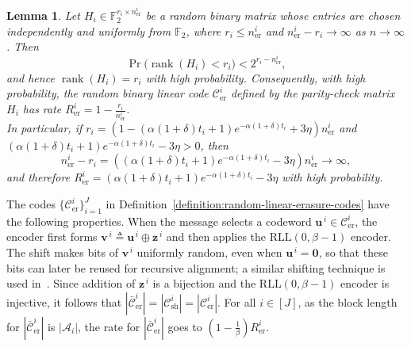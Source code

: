 \documentclass[journal,letterpaper,onecolumn,11pt]{IEEEtran}
\newcommand{\cA}{\mathcal{A}}
\newcommand{\cC}{\mathcal{C}}
\newcommand{\boldu}{\mathbf{u}}
\newcommand{\boldv}{\mathbf{v}}
\newcommand{\boldz}{\mathbf{z}}
\newtheorem{lemma}{Lemma}
\begin{document}
\begin{lemma}\label{lemma:full rank random parity matrix}\cite[Lemmas~3]{liu2026improved}
Let $H_i\in\mathbb{F}_2^{r_i\times n^i_{\mathrm{er}}}$ be a random binary matrix
whose entries are chosen independently and uniformly from $\mathbb{F}_2$,
where $r_i\le n^i_{\mathrm{er}}$ and
$n^i_{\mathrm{er}}-r_i\to\infty$ as $n\to\infty$.
Then
\[
\Pr\bigl(\operatorname{rank}(H_i)<r_i\bigr)
<
2^{r_i-n^i_{\mathrm{er}}},
\]
and hence $\operatorname{rank}(H_i)=r_i$ with high probability.
Consequently, with high probability, the random binary linear code
$\cC^i_{\mathrm{er}}$ defined by the parity-check matrix $H_i$ has rate
$R^i_{\mathrm{er}}=1-\frac{r_i}{n^i_{\mathrm{er}}}$.
\\
In particular, if
$r_i=\left(1-(\alpha(1+\delta)t_i+1)e^{-\alpha(1+\delta)t_i}+3\eta\right)n^i_{\mathrm{er}}$
and
$(\alpha(1+\delta)t_i+1)e^{-\alpha(1+\delta)t_i}-3\eta>0$,
then
\[
n^i_{\mathrm{er}}-r_i
=
\left((\alpha(1+\delta)t_i+1)e^{-\alpha(1+\delta)t_i}-3\eta\right)
n^i_{\mathrm{er}}
\to\infty,
\]
and therefore
$R^i_{\mathrm{er}}=(\alpha(1+\delta)t_i+1)e^{-\alpha(1+\delta)t_i}-3\eta$
with high probability.
\end{lemma}

The codes $\{\cC_{\mathrm{er}}^i\}_{i=1}^{J}$ in Definition~\ref{definition:random-linear-erasure-codes} have the following properties.
When the message selects a codeword \(\boldu^{\,i}\in\cC_{\mathrm{er}}^i\), the encoder first forms \(\boldv^{\,i}\triangleq\boldu^{\,i}\oplus\boldz^{\,i}\) and then applies the \(\mathrm{RLL}(0,\beta-1)\) encoder. 
The shift makes bits of \(\boldv^{\,i}\) uniformly random, even when \(\boldu^{\,i}=\mathbf 0\), so that these bits can later be reused for recursive alignment; a similar shifting technique is used in~\cite{shomorony2021torn}. 
Since addition of \(\boldz^{\,i}\) is a bijection and the \(\mathrm{RLL}(0,\beta-1)\) encoder is injective, it follows that \(\left|\bar{\cC}_{\mathrm{er}}^i\right|=\left|\cC_{\mathrm{sh}}^i\right|=\left|\cC_{\mathrm{er}}^i\right|\). 
For all $i\in [J]$, as the block length for $\left|\bar{\cC}_{\mathrm{er}}^i\right|$ is $|\cA_i|$, the rate for $\left|\bar{\cC}_{\mathrm{er}}^i\right|$ goes to $(1-\frac{1}{\beta})R^i_{\mathrm{er}}$. 
\end{document}
